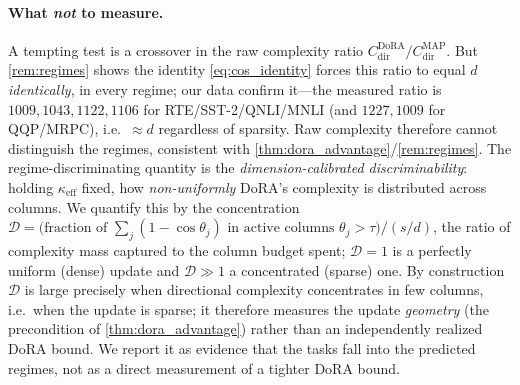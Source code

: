 \documentclass[10pt]{article}
\begin{document}
\paragraph{What \emph{not} to measure.} A tempting test is a crossover in the raw
complexity ratio $C^{\mathrm{DoRA}}_{\mathrm{dir}}/C^{\mathrm{MAP}}_{\mathrm{dir}}$. But
\cref{rem:regimes} shows the identity \eqref{eq:cos_identity} forces this ratio to
equal $d$ \emph{identically}, in every regime; our data confirm it---the measured
ratio is $1009,1043,1122,1106$ for RTE/SST-2/QNLI/MNLI (and $1227,1009$ for QQP/MRPC),
i.e.\ ${\approx}d$ regardless of sparsity. Raw complexity therefore cannot distinguish
the regimes, consistent with
\cref{thm:dora_advantage}/\cref{rem:regimes}. The regime-discriminating quantity is the
\emph{dimension-calibrated discriminability}: holding $\kappa_{\mathrm{eff}}$ fixed,
how \emph{non-uniformly} DoRA's complexity is distributed across columns. We quantify
this by the concentration
$\mathcal{D}=\big(\text{fraction of }\sum_j(1-\cos\theta_j)\text{ in active columns }\theta_j>\tau\big)\big/(s/d)$,
the ratio of complexity mass captured to the column budget spent; $\mathcal{D}{=}1$ is
a perfectly uniform (dense) update and $\mathcal{D}{\gg}1$ a concentrated (sparse) one.
By construction $\mathcal{D}$ is large precisely when directional complexity
concentrates in few columns, i.e.\ when the update is sparse; it therefore measures the
update \emph{geometry} (the precondition of \cref{thm:dora_advantage}) rather than an
independently realized DoRA bound. We report it as evidence that the tasks fall into the
predicted regimes, not as a direct measurement of a tighter DoRA bound.
\end{document}

